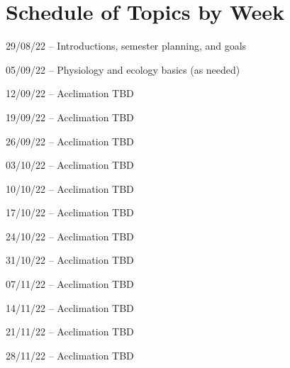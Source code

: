 \documentclass[12pt, notitlepage]{article}   	%
\begin{document}
{\section{Schedule of Topics by Week}
29/08/22 – Introductions, semester planning, and goals \par
05/09/22 – Physiology and ecology basics (as needed) \par
12/09/22 – Acclimation TBD \par
19/09/22 – Acclimation TBD \par
26/09/22 – Acclimation TBD \par
03/10/22 – Acclimation TBD \par
10/10/22 – Acclimation TBD \par
17/10/22 – Acclimation TBD \par
24/10/22 – Acclimation TBD \par
31/10/22 – Acclimation TBD \par
07/11/22 – Acclimation TBD \par
14/11/22 – Acclimation TBD \par
21/11/22 – Acclimation TBD \par
28/11/22 – Acclimation TBD \par

} %
\end{document}
